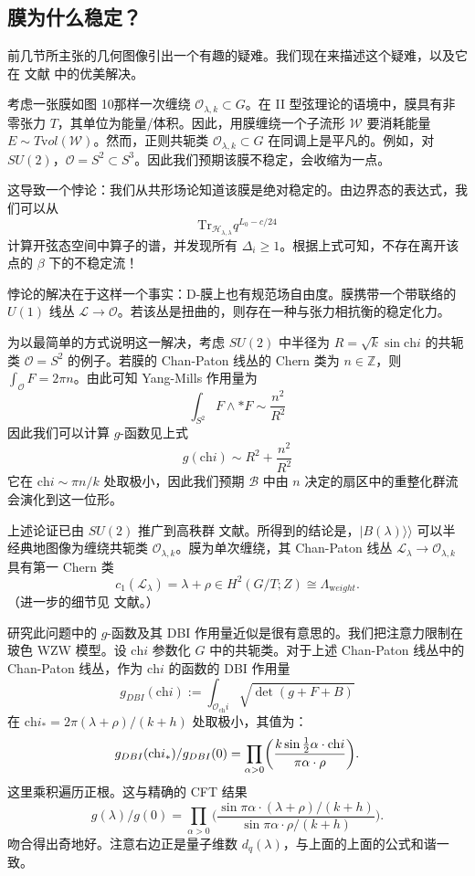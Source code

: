 \documentclass[11pt,a4paper]{ctexart}
\begin{document}
\subsection{膜为什么稳定？}\label{ux819cux4e3aux4ec0ux4e48ux7a33ux5b9a}

前几节所主张的几何图像引出一个有趣的疑难。我们现在来描述这个疑难，以及它在 文献 中的优美解决。

考虑一张膜如图 10那样一次缠绕 \({\mathcal O}_{\lambda,k}\subset G\)。在 II 型弦理论的语境中，膜具有非零张力 \(T\)，其单位为能量/体积。因此，用膜缠绕一个子流形 \({\mathcal W}\) 要消耗能量 \(E\sim T{\mathrm vol}({\mathcal W})\)。然而，正则共轭类 \({\mathcal O}_{\lambda,k} \subset G\) 在同调上是平凡的。例如，对 \(SU(2)\)，\({\mathcal O}=S^2\subset S^3\)。因此我们预期该膜不稳定，会收缩为一点。

这导致一个悖论：我们从共形场论知道该膜是绝对稳定的。由边界态的表达式，我们可以从 \[{\mathrm{Tr}}_{
{\mathcal H}_{\lambda, \lambda} } q^{L_0 - c/24}\] 计算开弦态空间中算子的谱，并发现所有 \(\Delta_i\geq 1\)。根据上式可知，不存在离开该点的 \(\beta\) 下的不稳定流！

悖论的解决在于这样一个事实：D-膜上也有规范场自由度。膜携带一个带联络的 \(U(1)\) 线丛 \({\mathcal L} \to {\mathcal O}\)。若该丛是扭曲的，则存在一种与张力相抗衡的稳定化力。

为以最简单的方式说明这一解决，考虑 \(SU(2)\) 中半径为 \(R=\sqrt{k}\sin \mathrm{ch}i\) 的共轭类 \({\mathcal O} = S^2\) 的例子。若膜的 Chan-Paton 线丛的 Chern 类为 \(n\in \mathbb{Z}\)，则 \(\int_{{\mathcal O}} F = 2\pi n\)。由此可知 Yang-Mills 作用量为 \[\int_{S^2} F\wedge * F \sim \frac{n^2}{R^2}\] 因此我们可以计算 \(g\)-函数见上式 \[g(\mathrm{ch}i) \sim R^2 + \frac{n^2}{R^2 }\] 它在 \(\mathrm{ch}i \sim \pi n/k\) 处取极小，因此我们预期 \({\mathcal B}\) 中由 \(n\) 决定的扇区中的重整化群流会演化到这一位形。

上述论证已由 \(SU(2)\) 推广到高秩群 文献。所得到的结论是，\(\vert B(\lambda) \rangle\rangle\) 可以半经典地图像为缠绕共轭类 \({\mathcal O}_{  \lambda,k}\)。膜为单次缠绕，其 Chan-Paton 线丛 \({\mathcal L}_{  \lambda} \to {\mathcal O}_{  \lambda,k}\) 具有第一 Chern 类 \[c_1({\mathcal L}_{  \lambda}) =   \lambda + \rho \in H^2(G/T;Z) \cong \Lambda_{\mathrm weight}.\] （进一步的细节见 文献。）

研究此问题中的 \(g\)-函数及其 DBI 作用量近似是很有意思的。我们把注意力限制在玻色 WZW 模型。设 \(\mathrm{ch}i\) 参数化 \(G\) 中的共轭类。对于上述 Chan-Paton 线丛中的 Chan-Paton 线丛，作为 \(\mathrm{ch}i\) 的函数的 DBI 作用量 \[g_{DBI}(  \mathrm{ch}i) := \int_{{\mathcal O}_\mathrm{ch}i} \sqrt{\det(g+ F+B)}\] 在 \(\mathrm{ch}i_* = 2\pi (\lambda + \rho)/(k+h)\) 处取极小，其值为： \[g_{DBI}(\mathrm{ch}i_*)/g_{DBI}(0) = \prod_{\alpha>0 } \biggl({k \sin \frac{1}{2} \alpha \cdot \mathrm{ch}i\over \pi
\alpha\cdot \rho}\biggr).\] 这里乘积遍历正根。这与精确的 CFT 结果 \[g(\lambda)/g(0) =
\prod_{\alpha>0 } \biggl(\frac{\sin \pi \alpha \cdot (\lambda+\rho)/(k+h)}{\sin \pi \alpha \cdot  \rho/(k+h)  }\biggr).\] 吻合得出奇地好。注意右边正是量子维数 \(d_q(\lambda)\)，与上面的上面的公式和谐一致。
\end{document}
